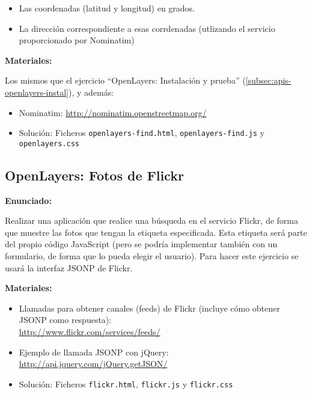 \begin{itemize}
\item Las coordenadas (latitud y longitud) en grados.
\item La dirección correspondiente a esas corrdenadas (utlizando el servicio proporcionado por Nominatim)
\end{itemize}

\textbf{Materiales:}

Los mismos que el ejercicio ``OpenLayers: Instalación y prueba'' (\ref{subsec:apis-openlayers-instal}), y además:

\begin{itemize}
\item Nominatim: \url{http://nominatim.openstreetmap.org/}
\item Solución: Ficheros \verb|openlayers-find.html|, \verb|openlayers-find.js| y \verb|openlayers.css|
\end{itemize}

\subsection{OpenLayers: Fotos de Flickr}
\label{subsec:apis-flickr}

\textbf{Enunciado:}

Realizar una aplicación que realice una búsqueda en el servicio Flickr, de forma que muestre las fotos que tengan la etiqueta especificada. Esta etiqueta será parte del propio código JavaScript (pero se podría implementar también con un formulario, de forma que lo pueda elegir el usuario). Para hacer este ejercicio se usará la interfaz JSONP de Flickr.

\textbf{Materiales:}

\begin{itemize}
\item Llamadas para obtener canales (feeds) de Flickr (incluye cómo obtener JSONP como respuesta): \\
  \url{http://www.flickr.com/services/feeds/}
\item Ejemplo de llamada JSONP con jQuery: \\
  \url{http://api.jquery.com/jQuery.getJSON/}
\item Solución: Ficheros \verb|flickr.html|, \verb|flickr.js| y \verb|flickr.css|
\end{itemize}



